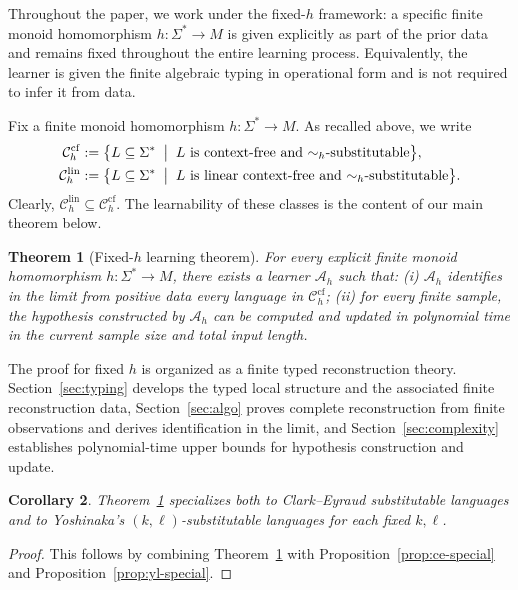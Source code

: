 \documentclass[11pt,a4paper]{article}
\newtheorem{theorem}{Theorem}[section]
\newtheorem{corollary}[theorem]{Corollary}
\newcommand{\cf}{\mathrm{cf}}
\newcommand{\lin}{\mathrm{lin}}
\newcommand{\Ccf}[1]{\mathcal C_{#1}^{\cf}}
\newcommand{\Clin}[1]{\mathcal C_{#1}^{\lin}}
\begin{document}
Throughout the paper, we work under the fixed-$h$ framework: a specific
finite monoid homomorphism $h:\Sigma^*\to M$ is given explicitly as part
of the prior data and remains fixed throughout the entire learning
process. Equivalently, the learner is given the finite algebraic typing
in operational form and is not required to infer it from data.

Fix a finite monoid homomorphism $h:\Sigma^*\to M$. As recalled above,
we write
\[
\begin{aligned}
\Ccf{h}
&:=\bigl\{
L\subseteq\Sigma^*
\;\bigm|\;
\text{$L$ is context-free and $\sim_h$-substitutable}
\bigr\},\\
\Clin{h}
&:=\bigl\{
L\subseteq\Sigma^*
\;\bigm|\;
\text{$L$ is linear context-free and $\sim_h$-substitutable}
\bigr\}.
\end{aligned}
\]
Clearly, $\Clin{h}\subseteq\Ccf{h}$. The learnability of these classes
is the content of our main theorem below.

\begin{theorem}[Fixed-\texorpdfstring{$h$}{h} learning theorem]
\label{thm:main}
For every explicit finite monoid homomorphism $h:\Sigma^*\to M$, there
exists a learner $\mathcal A_h$ such that: \textup{(i)} $\mathcal A_h$
identifies in the limit from positive data every language in
$\Ccf{h}$; \textup{(ii)} for every finite sample, the hypothesis
constructed by $\mathcal A_h$ can be computed and updated in polynomial
time in the current sample size and total input length.
\end{theorem}

The proof for fixed $h$ is organized as a finite typed reconstruction
theory. Section~\ref{sec:typing} develops the typed local structure and
the associated finite reconstruction data, Section~\ref{sec:algo}
proves complete reconstruction from finite observations and derives
identification in the limit, and Section~\ref{sec:complexity}
establishes polynomial-time upper bounds for hypothesis construction and
update.

\begin{corollary}\label{cor:ce-yoshinaka}
Theorem~\ref{thm:main} specializes both to Clark--Eyraud substitutable
languages and to Yoshinaka's $(k,\ell)$-substitutable languages for each
fixed $k,\ell$.
\end{corollary}

\begin{proof}
This follows by combining Theorem~\ref{thm:main} with
Proposition~\ref{prop:ce-special} and
Proposition~\ref{prop:yl-special}.
\end{proof}
\end{document}
